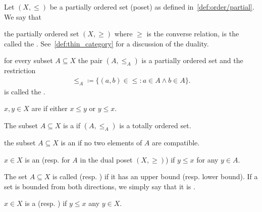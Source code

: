 \begin{definition}\label{def:poset}
  Let \( (X, \leq) \) be a partially ordered set (poset) as defined in~\cref{def:order/partial}. We say that

  \begin{defenum}
    \item\label{def:poset/dual} the partially ordered set \( (X, \geq) \) where \( \geq \) is the converse relation, is the called the . See~\cref{def:thin_category} for a discussion of the duality.

    \item\label{def:poset/subset_order} for every subset \( A \subseteq X \) the pair \( (A, \leq_A) \) is a partially ordered set and the restriction
    \begin{align*}
      \leq_A \coloneqq \{ (a, b) \in \leq \colon a \in A \land b \in A \}.
    \end{align*}
    is called the .

    \item\label{def:poset/comparable_elements} \( x, y \in X \) are  if either \( x \leq y \) or \( y \leq x \).

    \item\label{def:poset/chain} The subset \( A \subseteq X \) is a  if \( (A, \leq_A) \) is a totally ordered set.

    \item\label{def:poset/antichain} the subset \( A \subseteq X \) is an  if no two elements of \( A \) are compatible.

    \item\label{def:poset/upper_lower_bound}\cite[170]{Enderton1977} \( x \in X \) is an  (resp.  for \( A \) in the dual poset \( (X, \geq) \)) if \( y \leq x \) for any \( y \in A \).

    \item\label{def:poset/bounded_set} The set \( A \subseteq X \) is called  (resp. ) if it has an upper bound (resp. lower bound). If a set is bounded from both directions, we simply say that it is .

    \item\label{def:poset/largest_smallest_element}\cite[171]{Enderton1977} \( x \in X \) is a  (resp. ) if \( y \leq x \) any \( y \in X \).


\end{defenum}
\end{definition}
